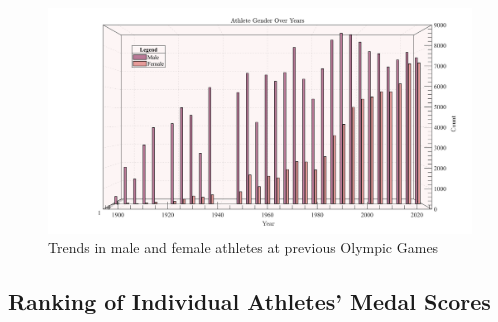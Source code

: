 \documentclass{mcmthesis}
\begin{document}
\begin{figure}[H]
	\centering
	\includegraphics[width=1\linewidth]{fig/nannv.png}
	\caption{Trends in male and female athletes at previous Olympic Games}
	\label{fig:nannv}
\end{figure}

\subsection{Ranking of Individual Athletes' Medal Scores}
\end{document}
